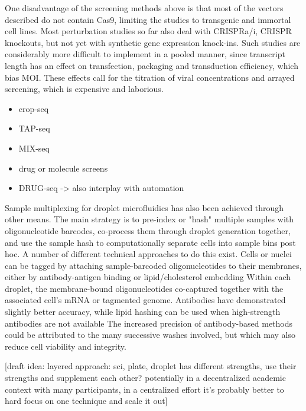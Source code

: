 One disadvantage of the screening methods above is that most of the vectors described do not contain Cas9, limiting the studies to transgenic and immortal cell lines. Most perturbation studies so far also deal with CRISPRa/i, CRISPR knockouts, but not yet with synthetic gene expression knock-ins. Such studies are considerably more difficult to implement in a pooled manner, since transcript length has an effect on transfection, packaging and transduction efficiency, which bias MOI. These effects call for the titration of viral concentrations and arrayed screening, which is expensive and laborious.

\begin{itemize}[noitemsep]
    \item crop-seq
    \item TAP-seq
    \item MIX-seq
    \item drug or molecule screens
    \item DRUG-seq -> also interplay with automation
\end{itemize}

Sample multiplexing for droplet microfluidics has also been achieved through other means. The main strategy is to pre-index or "hash" multiple samples with oligonucleotide barcodes, co-process them through droplet generation together, and use the sample hash to computationally separate cells into sample bins post hoc. A number of different technical approaches to do this exist. Cells or nuclei can be tagged by attaching sample-barcoded oligonucleotides to their membranes, either by antibody-antigen binding or lipid/cholesterol embedding Within each droplet, the membrane-bound oligonucleotides co-captured together with the associated cell's mRNA or tagmented genome. Antibodies have demonstrated slightly better accuracy, while lipid hashing can be used when high-strength antibodies are not available The increased precision of antibody-based methods could be attributed to the many successive washes involved, but which may also reduce cell viability and integrity.

[draft idea: layered approach: sci, plate, droplet has different strengths, use their strengths and supplement each other? potentially in a decentralized academic context with many participants, in a centralized effort it's probably better to hard focus on one technique and scale it out]

